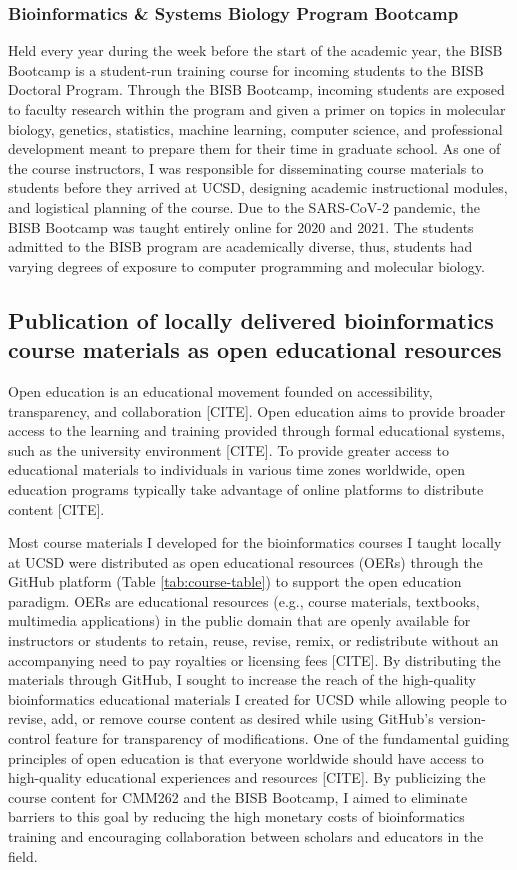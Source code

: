 \subsubsection{Bioinformatics \& Systems Biology Program Bootcamp}
Held every year during the week before the start of the academic year, the BISB Bootcamp is a student-run training course for incoming students to the BISB Doctoral Program. Through the BISB Bootcamp, incoming students are exposed to faculty research within the program and given a primer on topics in molecular biology, genetics, statistics, machine learning, computer science, and professional development meant to prepare them for their time in graduate school. As one of the course instructors, I was responsible for disseminating course materials to students before they arrived at UCSD, designing academic instructional modules, and logistical planning of the course. Due to the SARS-CoV-2 pandemic, the BISB Bootcamp was taught entirely online for 2020 and 2021. The students admitted to the BISB program are academically diverse, thus, students had varying degrees of exposure to computer programming and molecular biology.

\subsection{Publication of locally delivered bioinformatics course materials as open educational resources}

Open education is an educational movement founded on accessibility, transparency, and collaboration [CITE]. Open education aims to provide broader access to the learning and training provided through formal educational systems, such as the university environment [CITE]. To provide greater access to educational materials to individuals in various time zones worldwide, open education programs typically take advantage of online platforms to distribute content [CITE].  

Most course materials I developed for the bioinformatics courses I taught locally at UCSD were distributed as open educational resources (OERs) through the GitHub platform (Table \ref{tab:course-table}) to support the open education paradigm. OERs are educational resources (e.g., course materials, textbooks, multimedia applications) in the public domain that are openly available for instructors or students to retain, reuse, revise, remix, or redistribute without an accompanying need to pay royalties or licensing fees [CITE]. By distributing the materials through GitHub, I sought to increase the reach of the high-quality bioinformatics educational materials I created for UCSD while allowing people to revise, add, or remove course content as desired while using GitHub’s version-control feature for transparency of modifications. One of the fundamental guiding principles of open education is that everyone worldwide should have access to high-quality educational experiences and resources [CITE]. By publicizing the course content for CMM262 and the BISB Bootcamp, I aimed to eliminate barriers to this goal by reducing the high monetary costs of bioinformatics training and encouraging collaboration between scholars and educators in the field.

